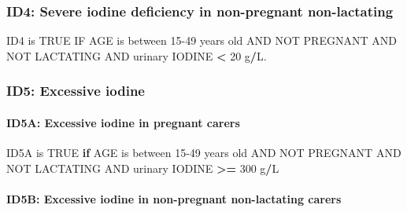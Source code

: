 \documentclass[12pt,a4paper]{article}
\newenvironment{Shaded}{\begin{snugshade}}{\end{snugshade}}
\newcommand{\ControlFlowTok}[1]{\textcolor[rgb]{0.13,0.29,0.53}{\textbf{#1}}}
\newcommand{\DecValTok}[1]{\textcolor[rgb]{0.00,0.00,0.81}{#1}}
\newcommand{\NormalTok}[1]{#1}
\newcommand{\OperatorTok}[1]{\textcolor[rgb]{0.81,0.36,0.00}{\textbf{#1}}}
\newcommand{\OtherTok}[1]{\textcolor[rgb]{0.56,0.35,0.01}{#1}}
\newcommand{\StringTok}[1]{\textcolor[rgb]{0.31,0.60,0.02}{#1}}
\let\oldparagraph\paragraph
\renewcommand{\paragraph}[1]{\oldparagraph{#1}\mbox{}}
\begin{document}
\hypertarget{id4-severe-iodine-deficiency-in-non-pregnant-non-lactating}{%
\subsubsection{ID4: Severe iodine deficiency in non-pregnant non-lactating}\label{id4-severe-iodine-deficiency-in-non-pregnant-non-lactating}}

\begin{Shaded}
\begin{Highlighting}[]
\NormalTok{ID4 is }\OtherTok{TRUE}\NormalTok{ IF AGE is between }\DecValTok{15-49}\NormalTok{ years old AND }
\NormalTok{  NOT PREGNANT AND NOT LACTATING AND }
\NormalTok{  urinary IODINE }\OperatorTok{<}\StringTok{ }\DecValTok{20}\NormalTok{ g}\OperatorTok{/}\NormalTok{L.}
\end{Highlighting}
\end{Shaded}

\hypertarget{id5-excessive-iodine}{%
\subsubsection{ID5: Excessive iodine}\label{id5-excessive-iodine}}

\hypertarget{id5a-excessive-iodine-in-pregnant-carers}{%
\paragraph{ID5A: Excessive iodine in pregnant carers}\label{id5a-excessive-iodine-in-pregnant-carers}}

\begin{Shaded}
\begin{Highlighting}[]
\NormalTok{ID5A is }\OtherTok{TRUE} \ControlFlowTok{if}\NormalTok{ AGE is between }\DecValTok{15-49}\NormalTok{ years old AND }
\NormalTok{  NOT PREGNANT AND NOT LACTATING AND }
\NormalTok{  urinary IODINE }\OperatorTok{>=}\StringTok{ }\DecValTok{300}\NormalTok{ g}\OperatorTok{/}\NormalTok{L}
\end{Highlighting}
\end{Shaded}

\hypertarget{id5b-excessive-iodine-in-non-pregnant-non-lactating-carers}{%
\paragraph{ID5B: Excessive iodine in non-pregnant non-lactating carers}\label{id5b-excessive-iodine-in-non-pregnant-non-lactating-carers}}
\end{document}
